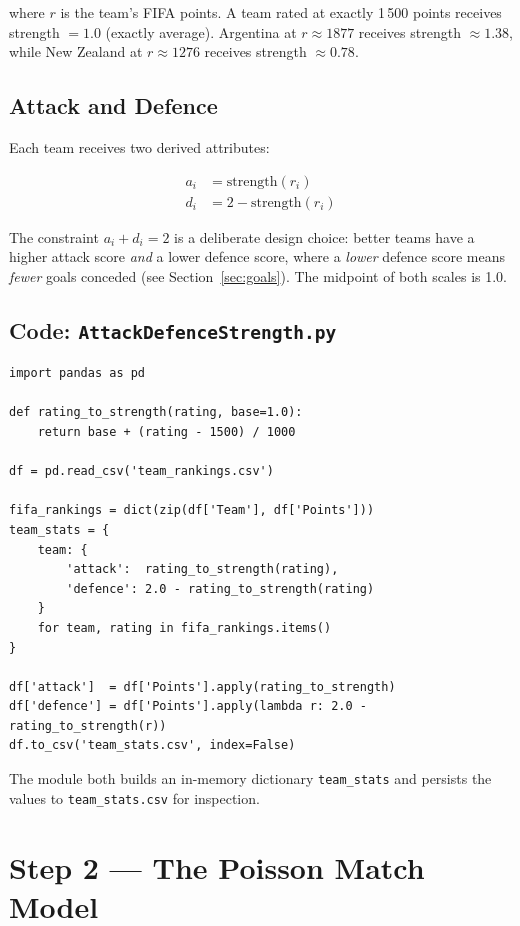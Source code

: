 \documentclass[12pt,a4paper]{article}
\begin{document}
where $r$ is the team's FIFA points.  A team rated at exactly 1\,500
points receives strength $= 1.0$ (exactly average).  Argentina at
$r \approx 1877$ receives strength $\approx 1.38$, while New Zealand at
$r \approx 1276$ receives strength $\approx 0.78$.

\subsection{Attack and Defence}

Each team receives two derived attributes:

\begin{align}
  a_i &= \text{strength}(r_i) \label{eq:attack}\\
  d_i &= 2 - \text{strength}(r_i) \label{eq:defence}
\end{align}

The constraint $a_i + d_i = 2$ is a deliberate design choice: better
teams have a higher attack score \emph{and} a lower defence score, where
a \emph{lower} defence score means \emph{fewer} goals conceded (see
Section~\ref{sec:goals}).  The midpoint of both scales is 1.0.

\subsection{Code: \texttt{AttackDefenceStrength.py}}

\begin{lstlisting}
import pandas as pd

def rating_to_strength(rating, base=1.0):
    return base + (rating - 1500) / 1000

df = pd.read_csv('team_rankings.csv')

fifa_rankings = dict(zip(df['Team'], df['Points']))
team_stats = {
    team: {
        'attack':  rating_to_strength(rating),
        'defence': 2.0 - rating_to_strength(rating)
    }
    for team, rating in fifa_rankings.items()
}

df['attack']  = df['Points'].apply(rating_to_strength)
df['defence'] = df['Points'].apply(lambda r: 2.0 - rating_to_strength(r))
df.to_csv('team_stats.csv', index=False)
\end{lstlisting}

The module both builds an in-memory dictionary \texttt{team\_stats} and
persists the values to \texttt{team\_stats.csv} for inspection.

\section{Step 2 --- The Poisson Match Model}
\label{sec:poisson}
\end{document}
